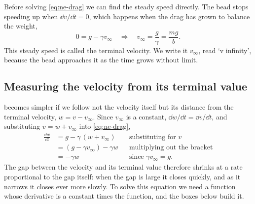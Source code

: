 Before solving \cref{eq:ne-drag} we can find the steady speed directly.
The bead stops speeding up when $\dd v/\dd t = 0$, which happens when the
drag has grown to balance the weight,
\begin{equation*}
   0 = g - \gamma v_\infty
   \quad\Longrightarrow\quad
   v_\infty = \frac{g}{\gamma} = \frac{mg}{b} .
\end{equation*}
This steady speed is called the terminal velocity. We write it
$v_\infty$, read `v infinity', because the bead approaches it as the time
grows without limit.

\subsection*{Measuring the velocity from its terminal value}

 becomes simpler if we follow not the velocity itself
but its distance from the terminal velocity, $w = v - v_\infty$. Since
$v_\infty$ is a constant, $\dd w/\dd t = \dd v/\dd t$, and substituting
$v = w + v_\infty$ into \cref{eq:ne-drag},
\begin{align*}
   \frac{\dd w}{\dd t}
   &= g - \gamma\,(w + v_\infty)
      && \text{substituting for $v$}\\
   &= (g - \gamma v_\infty) - \gamma w
      && \text{multiplying out the bracket}\\
   &= -\gamma w
      && \text{since $\gamma v_\infty = g$.}
\end{align*}
The gap between the velocity and its terminal value therefore shrinks at
a rate proportional to the gap itself: when the gap is large it closes
quickly, and as it narrows it closes ever more slowly. To solve this
equation we need a function whose derivative is a constant times the
function, and the boxes below build it.

